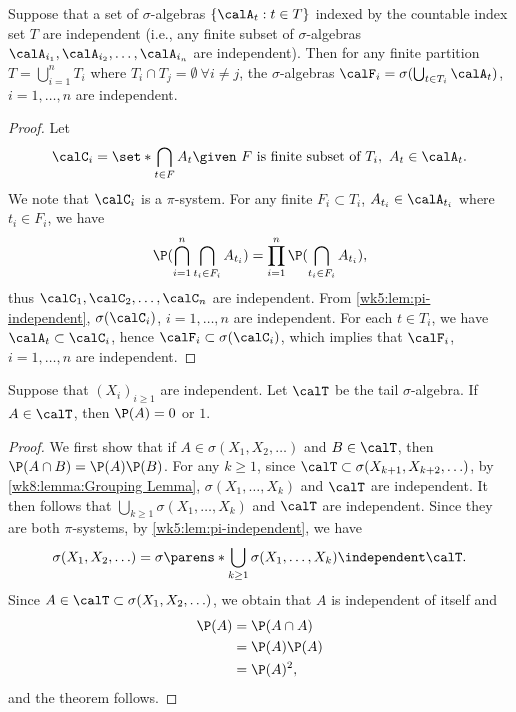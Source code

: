 \documentclass[../aipt.tex]{subfiles}
\begin{document}
\begin{Lemma}\label{wk8:lemma:Grouping Lemma}
Suppose that a set of $\sigma$-algebras $\{\calA_t: t\in T\}$ indexed by the countable index set $T$ are independent (i.e., any finite subset of $\sigma$-algebras $\calA_{i_1},\calA_{i_2},\ldots,\calA_{i_n}$ are independent). Then for any finite partition $T= \bigcup_{i=1}^{n} T_i$ where $T_i \cap T_j = \emptyset \ \forall i\neq j$, the $\sigma$-algebras $\calF_i=\sigma(\bigcup_{t\in T_i}\calA_t)$, $i=1,\ldots,n$ are independent. 
\end{Lemma}
\begin{proof}
Let 
\begin{align*}
\calC_i =\set*{\bigcap_{t \in F} A_t\given \text{ $F$ is finite subset of } T_i,\ A_t \in \calA_t}.
\end{align*}
We note that $\calC_i $ is a $\pi$-system. For any finite $F_i \subset T_i$, $A_{t_i} \in \calA_{t_i}$ where $t_i\in F_i$, we have
\begin{align*}
\P (\bigcap_{i=1}^n \bigcap_{t_i\in F_i} A_{t_i})= \prod_{i=1}^n \P(\bigcap_{t_i\in F_i} A_{t_i}),
\end{align*}
thus $\calC_1,\calC_2,\ldots ,\calC_n$ are independent. From \cref{wk5:lem:pi-independent}, $\sigma(\calC_i)$, $i=1,\ldots,n$ are independent. For each $t \in T_i$, we have $\calA_t \subset \calC_i$, hence $\calF_i \subset \sigma(\calC_i)$, which implies that $\calF_i$, $i=1,\ldots,n$ are independent.
\end{proof}

\begin{Theorem} 
Suppose that $(X_i)_{i\geq1}$ are independent. Let $\calT$ be the tail $\sigma$-algebra. If $A \in\calT$, then $\P(A)=0$ or $1$.
\end{Theorem}
\begin{proof}
We first show that if $A \in \sigma(X_1,X_2,\ldots)$ and  $B\in\calT$, then $\P(A\cap B) = \P(A) \P(B)$.
For any $k\geq1$, since $\calT \subset \sigma(X_{k+1},X_{k+2},\ldots)$, by \cref{wk8:lemma:Grouping Lemma}, $\sigma(X_1,\ldots,X_k)$ and $\calT$ are independent. It then follows that $\bigcup_{k\geq1}\sigma(X_1,\ldots,X_k)$ and $\calT$ are independent. Since they are both $\pi$-systems, by \cref{wk5:lem:pi-independent}, we have 
\begin{align*}
\sigma(X_1,X_2,\ldots)=\sigma\parens*{\bigcup_{k\geq1}\sigma(X_1,\ldots,X_k)} \independent \calT. 
\end{align*}
Since $A\in \calT \subset \sigma(X_1,X_2,\ldots)$, we obtain that $A$ is independent of itself and
\begin{align*}
\P(A)&=\P(A\cap A)\\
&=\P (A)\P (A)\\
&=\P (A) ^2,
\end{align*}
and the theorem follows.
\end{proof}
\end{document}
